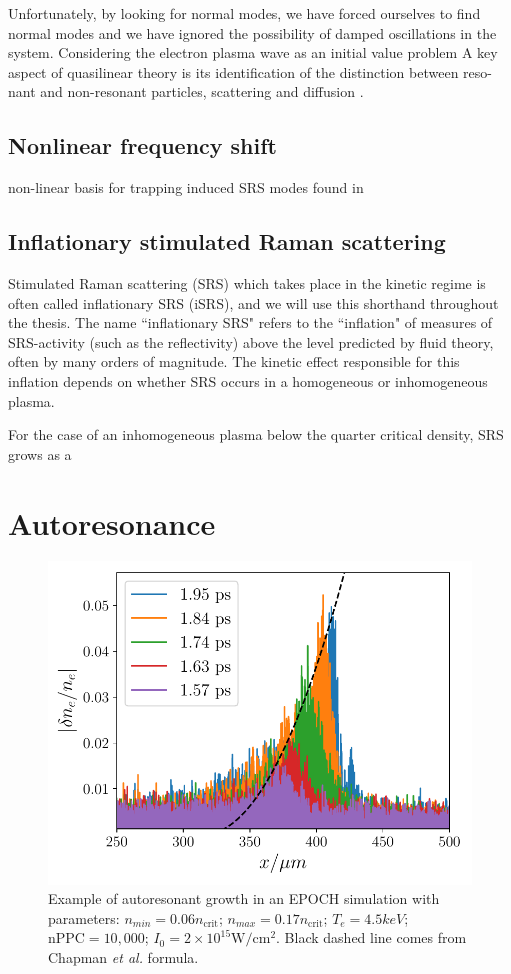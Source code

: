 Unfortunately, by looking for normal modes, we have forced ourselves to find normal modes and we have ignored the possibility of damped oscillations in the system. Considering the electron plasma wave as an initial value problem 
A key aspect of quasilinear theory is its identification of the distinction between reso-
nant and non-resonant particles, scattering and diffusion \citep{Sagdeev2018}.

\subsection{Nonlinear frequency shift}
non-linear basis for trapping induced SRS modes found in \cite{Rose2001}


\subsection{Inflationary stimulated Raman scattering}

Stimulated Raman scattering (\acrshort{SRS}) which takes place in the kinetic regime is often called inflationary SRS (\acrshort{iSRS}), and we will use this shorthand throughout the thesis. The name ``inflationary SRS" refers to the ``inflation" of measures of SRS-activity (such as the reflectivity) above the level predicted by fluid theory, often by many orders of magnitude. The kinetic effect responsible for this inflation depends on whether SRS occurs in a homogeneous or inhomogeneous plasma.

For the case of an inhomogeneous plasma below the quarter critical density, SRS grows as a 




\section{Autoresonance}

\begin{figure}[ht]
    \centering
    \includegraphics[width=0.8\columnwidth]{Chapters/C2_Theory/AR_diagnostic.pdf}
    \caption{Example of autoresonant growth in an EPOCH simulation with parameters: $n_{min} = 0.06 n_{\text{crit}}$; $n_{max} = 0.17 n_{\text{crit}}$; $T_e = 4.5\si{keV}$; $\text{nPPC}=10,000$; $I_0 = 2 \times 10^{15}\si{\watt / \centi\metre^2}$. Black dashed line comes from Chapman \textit{et al.} \citep{Chapman2012} formula.}
    \label{fig:AR_diagnostic}
\end{figure}{}



